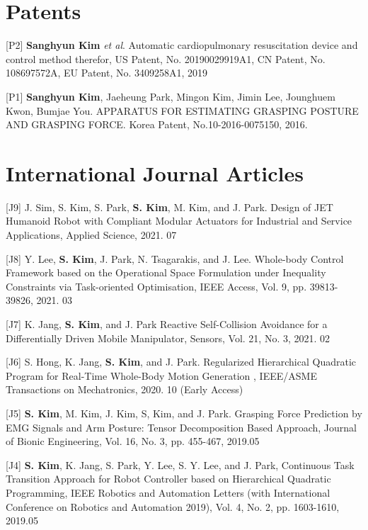 \documentclass[margin,line]{res}
\begin{document}
\begin{resume}
  \section{\sc Patents}
   [P2]  \textbf{Sanghyun Kim} \textit{et al}. Automatic cardiopulmonary resuscitation device and control method therefor, US Patent, No. 20190029919A1, CN Patent, No. 108697572A, EU Patent, No. 3409258A1, 2019

    [P1] \textbf{Sanghyun Kim}, {Jaeheung Park}, Mingon Kim, Jimin Lee, Jounghuem Kwon, Bumjae You.
  APPARATUS FOR ESTIMATING GRASPING POSTURE AND GRASPING FORCE.
  Korea Patent, No.10-2016-0075150, 2016.


  \section{\sc International Journal Articles}
   [J9] J. Sim, S. Kim, S. Park, \textbf{S. Kim}, M. Kim, and J. Park.
  Design of JET Humanoid Robot with Compliant Modular Actuators for Industrial and Service Applications,
  Applied Science, 2021. 07

    [J8] Y. Lee, \textbf{S. Kim}, J. Park, N. Tsagarakis, and J. Lee.
  Whole-body Control Framework based on the Operational Space Formulation under Inequality Constraints via Task-oriented Optimisation,
  IEEE Access, Vol. 9, pp. 39813-39826, 2021. 03

    [J7] K. Jang, \textbf{S. Kim}, and J. Park
  Reactive Self-Collision Avoidance for a Differentially Driven Mobile Manipulator,
  Sensors, Vol. 21, No. 3, 2021. 02

    [J6] S. Hong, K. Jang, \textbf{S. Kim}, and J. Park.
  Regularized Hierarchical Quadratic Program for Real-Time Whole-Body Motion Generation ,
  IEEE/ASME Transactions on Mechatronics, 2020. 10 (Early Access)

  [J5] \textbf{S. Kim}, M. Kim, J. Kim, S, Kim, and J. Park.
  Grasping Force Prediction by EMG Signals and Arm Posture: Tensor Decomposition Based Approach,
  Journal of Bionic Engineering, Vol. 16, No. 3, pp.  455-467, 2019.05

    [J4] \textbf{S. Kim}, K. Jang, S. Park, Y. Lee, S. Y. Lee, and J. Park, Continuous Task Transition Approach for Robot Controller based on Hierarchical Quadratic Programming, IEEE Robotics and Automation Letters (with International Conference on Robotics and Automation 2019), Vol. 4, No. 2, pp. 1603-1610, 2019.05


\end{resume}
\end{document}
